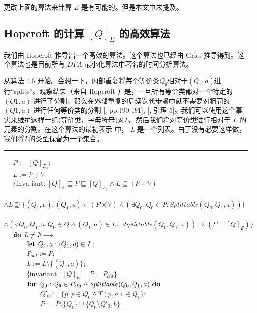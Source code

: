 更改上面的算法来计算 $E$ 是有可能的。但是本文中未提及。

\subsection{Hopcroft 的计算 $[Q]_E$ 的高效算法}

我们由 Hopcroft 推导出一个高效的算法。这个算法也已经由 Gries \cite{Grie73} 推导得到。这个算法也是目前所有 $DFA$ 最小化算法中著名的时间分析算法。

从算法 4.6 开始。会想一下，内部重复将每个等价类$Q_0$相对于$(Q_1, a)$进行“splits”。观察结果（来自 Hopcroft ）是，一旦所有等价类都对一个特定的 $(Q1,a)$ 进行了分割，那么在外部重复的后续迭代步骤中就不需要对相同的$(Q1,a)$ 进行任何等价类的分割 [\cite{Hopc71}, pp.190-191], [\cite{Grie73}, 引理 5]。我们可以使用这个事实来维护这样一组(等价类，字母符号)对$L$。然后我们将对等价类进行相对于 $L$ 的元素的分割。在这个算法的最初表示 \cite{Hopc71, Grie73} 中， $L$ 是一个列表。由于没有必要这样做，我们将$L$的类型保留为一个集合。
\rule{\textwidth}{1pt}
\mbox{　} $P:=[Q]_{E_0}$; \\
\mbox{　} $L:=P\times V$; \\
\mbox{　} $ \{ \mbox{invariant: } [Q]_E \sqsubseteq P \sqsubseteq [Q]_{E_0} \land L \subseteq (P \times V) $ \\
\mbox{　　　} $ \land L \supseteq  \{ (Q_1,a) : (Q_1,a) \in (P \times V) \land ( \exists Q_0 : Q_0 \in P : Splittable (Q_0,Q_1,a) ) \} $ \\
\mbox{　　　} $ \land (\forall Q_0,Q_1,a:Q_0 \in Q \land (Q_1,a) \in L : \neg Splittable (Q_0,Q_1,a)) \Rightarrow (P=[Q]_E) \} $ \\
\mbox{　} $ \mbox{\textbf{do }} L \not= \emptyset \longrightarrow $ \\ 
\mbox{　　　} $ \mbox{\textbf{let }} Q_1,a:(Q_1,a) \in L $; \\
\mbox{　　　} $ P_{old} := P $; \\
\mbox{　　　} $ L := L \setminus \{ (Q_1,a) \} $; \\
\mbox{　　　} $ \{  \mbox{invariant }: [Q]_E \sqsubseteq P \sqsubseteq P_{old} \} $ \\
\mbox{　　　} $ \mbox{\textbf{for }} Q_0 : Q_0 \in P_{old} \land Splittable (Q_0,Q_1,a) \mbox{\textbf{ do }} $ \\
\mbox{　　　　　} $ Q'_0 := \{ p:p \in Q_0 \land T(p,a) \in Q_1 \} $; \\
\mbox{　　　　　} $ P:= P \setminus \{ Q_0 \} \cup \{ Q_0 \setminus Q'_0,b \} $;\\
